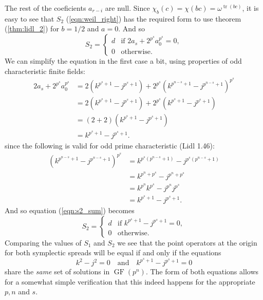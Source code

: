 \documentclass[a4paper, 11pt]{article}
\DeclareMathOperator{\GF}{GF}
\DeclareMathOperator{\tr}{tr}
\begin{document}
  The rest of the coeficients $a_{r-i}$ are null. Since
  $\chi_b(c) = \chi(bc) = \omega^{\tr(bc)}$, it is easy to
  see that $S_2$ (\ref{eqn:weil_right}) has the required
  form to use theorem (\ref{thm:lidl_2}) for $b = 1 / 2$ and
  $a = 0$. And so
  \begin{equation}
    \label{eqn:s2_sum}
    S_2
    = \begin{cases}
      d & \text{if } 2a_s + 2^{p^{s}}a_0^{p^{s}} = 0, \\
      0 & \text{otherwise.}
    \end{cases}
  \end{equation}
  We can simplify the equation in the first case a bit,
  using properties of odd characteristic finite fields:
  \begin{align*}
    2a_s + 2^{p^{s}} a_0^{p^{s}}
    &= 2 \left( k^{p^{s}+1} - j^{p^{s}+1} \right) 
    + 2^{p^{s}} \left( k^{p^{n-s}+1} - j^{p^{n-s}+1}
    \right)^{p^{s}} \\
    &= 2 \left( k^{p^{s}+1} - j^{p^{s}+1} \right)
    + 2^{p^{s}} \left( k^{p^{s}+1} - j^{p^{s}+1} \right) \\
    &= (2 + 2) \left( k^{p^{s}+1} - j^{p^{s}+1} \right) \\
    &= k^{p^{s}+1} - j^{p^{s}+1}. 
  \end{align*}
  since the following is valid for odd prime characteristic
  (Lidl 1.46):
  \begin{align*}
    \left( k^{p^{n-s}+1} - j^{p^{n-s}+1} \right)^{p^{s}}
    &= k^{p^{s}(p^{n-s}+1)} - j^{p^{s}(p^{n-s}+1)} \\
    &= k^{p^{n} + p^{s}} - j^{p^{n}+p^{s}} \\
    &= k^{p^{n}}k^{p^{s}} - j^{p^{n}}j^{p^{s}} \\
    &= k^{p^{s}+1} - j^{p^{s}+1}.
  \end{align*}
  And so equation (\ref{eqn:s2_sum}) becomes 
   \begin{equation}
    \label{eqn:s2_value}
    S_2
    = \begin{cases}
      d & \text{if } k^{p^{s}+1} - j^{p^{s}+1} = 0, \\
      0 & \text{otherwise}.
    \end{cases}
  \end{equation}
  Comparing the values of $S_1$ and $S_2$ we see that the
  point operators at the origin for both symplectic spreads
  will be equal if and only if the equations
  \begin{equation}
    \label{eqn:system}
    k^2 - j^2 = 0
    \quad
    \text{and}
    \quad
    k^{p^{s}+1} - j^{p^{s}+1} = 0
  \end{equation}
  share the \textit{same} set of solutions in $\GF(p^{n})$.
  The form of both equations allows for a somewhat simple
  verification that this indeed happens for the appropriate
  $p, n$ and $s$.
\end{document}
